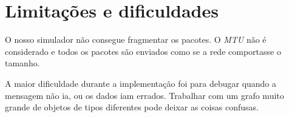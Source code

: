 \section{Limitações e dificuldades}

O nosso simulador não consegue fragmentar os pacotes. O \emph{MTU} não é
considerado e todos os pacotes são enviados como se a rede comportasse o
tamanho.

A maior dificuldade durante a implementação foi para debugar quando a
mensagem não ia, ou os dados iam errados. Trabalhar com um grafo muito
grande de objetos de tipos diferentes pode deixar as coisas confusas.

